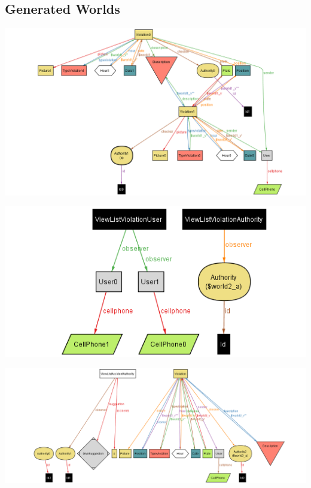 
\newpage
\subsection{Generated Worlds}

\vspace{0.5cm}
\includegraphics[width=\textwidth]{Images/AlloyWorlds/World1.png}
\vspace{1cm}

\vspace{0.5cm}
\includegraphics[width=\textwidth]{Images/AlloyWorlds/World2.png}
\newpage

\vspace{0.5cm}
\includegraphics[width=\textwidth]{Images/AlloyWorlds/World3.png}
